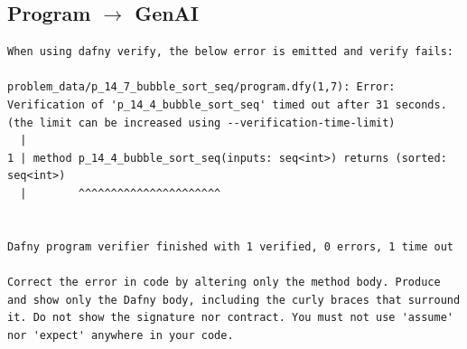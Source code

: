 \documentclass{article}
\begin{document}
\subsection*{Program $\rightarrow$ GenAI}
\begin{lstlisting}
When using dafny verify, the below error is emitted and verify fails:

problem_data/p_14_7_bubble_sort_seq/program.dfy(1,7): Error: Verification of 'p_14_4_bubble_sort_seq' timed out after 31 seconds. (the limit can be increased using --verification-time-limit)
  |
1 | method p_14_4_bubble_sort_seq(inputs: seq<int>) returns (sorted: seq<int>)
  |        ^^^^^^^^^^^^^^^^^^^^^^


Dafny program verifier finished with 1 verified, 0 errors, 1 time out

Correct the error in code by altering only the method body. Produce and show only the Dafny body, including the curly braces that surround it. Do not show the signature nor contract. You must not use 'assume' nor 'expect' anywhere in your code.
\end{lstlisting}
\end{document}
